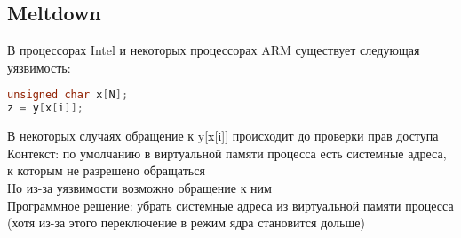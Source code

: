 \documentclass[12pt]{article}
\begin{document}
\subsection{Meltdown}
В процессорах Intel и некоторых процессорах ARM существует следующая уязвимость:\\
\begin{lstlisting}[language=C]
unsigned char x[N];
z = y[x[i]];
\end{lstlisting}
В некоторых случаях обращение к y[x[i]] происходит до проверки прав доступа\\
Контекст: по умолчанию в виртуальной памяти процесса есть системные адреса, к которым не разрешено обращаться\\
Но из-за уязвимости возможно обращение к ним\\
Программное решение: убрать системные адреса из виртуальной памяти процесса (хотя из-за этого переключение в режим ядра становится дольше)\\
\end{document}
